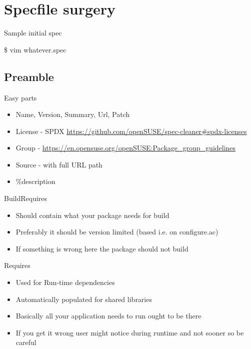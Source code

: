 \documentclass{beamer}
\begin{document}
\section{Specfile surgery}

\begin{frame}[t]{Sample initial spec}
	\begin{center}\$ vim whatever.spec\end{center}
\end{frame}

\subsection{Preamble}

\begin{frame}[t]{Easy parts}
	\begin{itemize}
	\item Name, Version, Summary, Url, Patch
    \item License - SPDX \url{https://github.com/openSUSE/spec-cleaner#spdx-licenses}
    \item Group - \url{https://en.opensuse.org/openSUSE:Package_group_guidelines}
    \item Source - with full URL path
    \item \%description
	\end{itemize}
\end{frame}

\begin{frame}[t]{BuildRequires}
	\begin{itemize}
	\item Should contain what your package needs for build
    \item Preferably it should be version limited (based i.e. on configure.ac)
    \item If something is wrong here the package should not build
	\end{itemize}
\end{frame}

\begin{frame}[t]{Requires}
	\begin{itemize}
    \item Used for Run-time dependencies
    \item Automatically populated for shared libraries
    \item Basically all your application needs to run ought to be there
    \item If you get it wrong user might notice during runtime and not sooner so be careful
	\end{itemize}
\end{frame}
\end{document}
